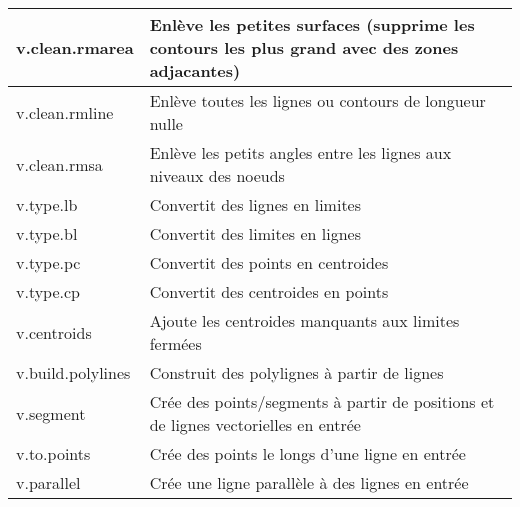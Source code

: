 \begin{center}
{\begin{longtable}{|p{2.5cm}|p{11.5cm}|}
  \hline v.clean.rmarea & Enlève les petites surfaces (supprime les contours les plus grand avec des zones adjacantes) \\
  \hline v.clean.rmline & Enlève toutes les lignes ou contours de longueur nulle\\
  \hline v.clean.rmsa & Enlève les petits angles entre les lignes aux niveaux des noeuds\\
  \hline v.type.lb & Convertit des lignes en limites\\
  \hline v.type.bl & Convertit des limites en lignes\\
  \hline v.type.pc & Convertit des points en centroides \\
  \hline v.type.cp & Convertit des centroides en points \\
  \hline v.centroids & Ajoute les centroides manquants aux limites fermées\\
  \hline v.build.polylines & Construit des polylignes à partir de lignes\\
  \hline v.segment & Crée des points/segments à partir de positions et de lignes vectorielles en entrée\\
  \hline v.to.points & Crée des points le longs d'une ligne en entrée\\
  \hline v.parallel & Crée une ligne parallèle à des lignes en entrée\\

\end{longtable}}
\end{center}
